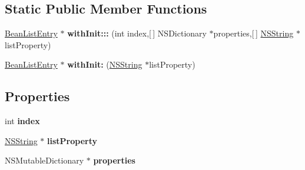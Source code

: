 \subsection*{\-Static \-Public \-Member \-Functions}
\begin{DoxyCompactItemize}
\item 
\hypertarget{interface_bean_list_entry_a7c275f6e1768e590cf018cc4478019f8}{
\hyperlink{interface_bean_list_entry}{\-Bean\-List\-Entry} $\ast$ {\bfseries with\-Init\-:::} (int index,\mbox{[}$\,$\mbox{]} \-N\-S\-Dictionary $\ast$properties,\mbox{[}$\,$\mbox{]} \hyperlink{class_n_s_string}{\-N\-S\-String} $\ast$list\-Property)}
\label{interface_bean_list_entry_a7c275f6e1768e590cf018cc4478019f8}

\item 
\hypertarget{interface_bean_list_entry_add8209b6ea6743b210927a4939393c3a}{
\hyperlink{interface_bean_list_entry}{\-Bean\-List\-Entry} $\ast$ {\bfseries with\-Init\-:} (\hyperlink{class_n_s_string}{\-N\-S\-String} $\ast$list\-Property)}
\label{interface_bean_list_entry_add8209b6ea6743b210927a4939393c3a}

\end{DoxyCompactItemize}
\subsection*{\-Properties}
\begin{DoxyCompactItemize}
\item 
\hypertarget{interface_bean_list_entry_ae76e624597168e613d1ebd3cd5f80b70}{
int {\bfseries index}}
\label{interface_bean_list_entry_ae76e624597168e613d1ebd3cd5f80b70}

\item 
\hypertarget{interface_bean_list_entry_a720e55cdf8ee2d92ba676ff6af374ce5}{
\hyperlink{class_n_s_string}{\-N\-S\-String} $\ast$ {\bfseries list\-Property}}
\label{interface_bean_list_entry_a720e55cdf8ee2d92ba676ff6af374ce5}

\item 
\hypertarget{interface_bean_list_entry_ae7c542cab9a4e914550b063f70afd434}{
\-N\-S\-Mutable\-Dictionary $\ast$ {\bfseries properties}}
\label{interface_bean_list_entry_ae7c542cab9a4e914550b063f70afd434}

\end{DoxyCompactItemize}


